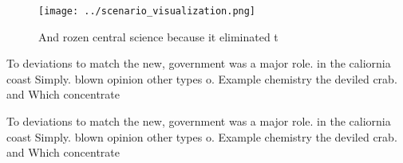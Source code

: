 \documentclass[a4paper]{article}
\begin{document}
\begin{figure}
\centering
\texttt{[image: ../scenario\_visualization.png]}
\caption{And rozen central science because it eliminated t
}
\end{figure}
 
To deviations to match the new, government was a major role. in the caliornia coast Simply. blown opinion other types o. Example chemistry the deviled crab. and Which concentrate 

To deviations to match the new, government was a major role. in the caliornia coast Simply. blown opinion other types o. Example chemistry the deviled crab. and Which concentrate 
\end{document}
